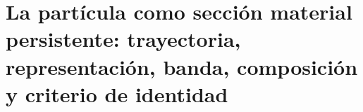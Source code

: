 \chapter{La partícula como sección material persistente: trayectoria, representación, banda, composición y criterio de identidad}
\label{chap:md-definicion-particula-definitiva}
\begingroup
\renewcommand{\chapter}[2][]{}%

\endgroup

